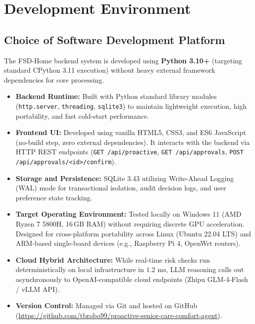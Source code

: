\documentclass[conference]{IEEEtran}
\begin{document}
\section{Development Environment}

\subsection{Choice of Software Development Platform}
The FSD-Home backend system is developed using \textbf{Python 3.10+} (targeting standard CPython 3.11 execution) without heavy external framework dependencies for core processing.
\begin{itemize}
    \item \textbf{Backend Runtime:} Built with Python standard library modules (\texttt{http.server}, \texttt{threading}, \texttt{sqlite3}) to maintain lightweight execution, high portability, and fast cold-start performance.
    \item \textbf{Frontend UI:} Developed using vanilla HTML5, CSS3, and ES6 JavaScript (no-build step, zero external dependencies). It interacts with the backend via HTTP REST endpoints (\texttt{GET /api/proactive}, \texttt{GET /api/approvals}, \texttt{POST /api/approvals/<id>/confirm}).
    \item \textbf{Storage and Persistence:} SQLite 3.43 utilizing Write-Ahead Logging (WAL) mode for transactional isolation, audit decision logs, and user preference state tracking.
    \item \textbf{Target Operating Environment:} Tested locally on Windows 11 (AMD Ryzen 7 5800H, 16\,GB RAM) without requiring discrete GPU acceleration. Designed for cross-platform portability across Linux (Ubuntu 22.04 LTS) and ARM-based single-board devices (e.g., Raspberry Pi 4, OpenWrt routers).
    \item \textbf{Cloud Hybrid Architecture:} While real-time risk checks run deterministically on local infrastructure in $1.2\text{ ms}$, LLM reasoning calls out asynchronously to OpenAI-compatible cloud endpoints (Zhipu GLM-4-Flash / vLLM API).
    \item \textbf{Version Control:} Managed via Git and hosted on GitHub (\url{https://github.com/tbrobo99/proactive-senior-care-comfort-agent}).
\end{itemize}
\end{document}
